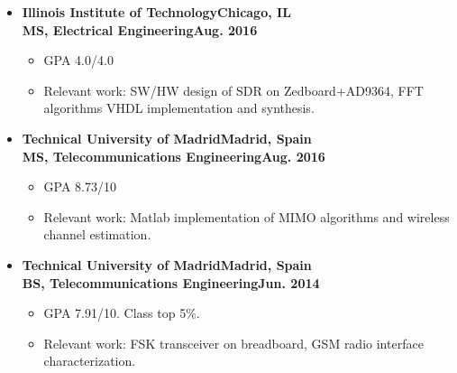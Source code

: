 \documentclass[10pt, letterpaper]{letter}
\begin{document}
\begin{itemize}[label=,leftmargin=0em]

    \item
    \textbf{Illinois Institute of Technology\hfill Chicago, IL}\vspace{2pt}\\
    \textbf{MS, Electrical Engineering\hfill Aug. 2016}\vspace{2pt}
    \begin{itemize}[nosep, leftmargin=1.15em]
        \item GPA 4.0/4.0
        \item Relevant work: SW/HW design of SDR on Zedboard+AD9364, FFT algorithms VHDL implementation and synthesis.
    \end{itemize}

\vfill

    \item
    \textbf{Technical University of Madrid\hfill Madrid, Spain}\vspace{2pt}\\
    \textbf{MS, Telecommunications Engineering\hfill Aug. 2016}\vspace{2pt}
    \begin{itemize}[nosep, leftmargin=1.15em]
        \item GPA 8.73/10
        \item Relevant work: Matlab implementation of MIMO algorithms and wireless channel estimation.
    \end{itemize}

\vfill

    \item
    \textbf{Technical University of Madrid\hfill Madrid, Spain\vspace{2pt}}\\
    \textbf{BS, Telecommunications Engineering\hfill Jun. 2014}\vspace{2pt}
    \begin{itemize}[nosep, leftmargin=1.15em]
        \item GPA 7.91/10. Class top 5\%.
        \item Relevant work: FSK transceiver on breadboard, GSM radio interface characterization.
    \end{itemize}

\end{itemize}

\vfill

\end{document}
